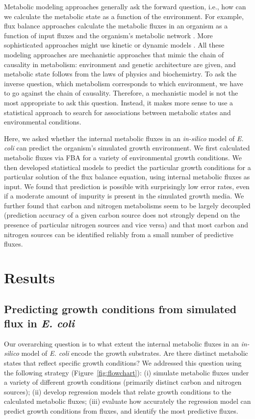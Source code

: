 \documentclass[12pt]{article}
\begin{document}
Metabolic modeling approaches generally ask the forward question, i.e., how can we calculate the metabolic state as a function of the environment. For example, flux balance approaches calculate the metabolic fluxes in an organism as a function of input fluxes and the organism's metabolic network \cite{Segreetal2002,Feistetal2007,SnitkinSegre2008,Orthetal2010}. More sophisticated approaches might use kinetic or dynamic models \cite{Covertetal2008,Adadietal2012}. All these modeling approaches are mechanistic approaches that mimic the chain of causality in metabolism: environment and genetic architecture are given, and metabolic state follows from the laws of physics and biochemistry. To ask the inverse question, which metabolism corresponds to which environment, we have to go against the chain of causality. Therefore, a mechanistic model is not the most appropriate to ask this question. Instead, it makes more sense to use a statistical approach to search for associations between metabolic states and environmental conditions.

Here, we asked whether the internal metabolic fluxes in an \emph{in-silico} model of \emph{E. coli} can predict the organism's simulated growth environment. We first calculated metabolic fluxes via FBA for a variety of environmental growth conditions. We then developed statistical models to predict the particular growth conditions for a particular solution of the flux balance equation, using internal metabolic fluxes as input. We found that prediction is possible with surprisingly low error rates, even if a moderate amount of impurity is present in the simulated growth media. We further found that carbon and nitrogen metabolisms seem to be largely decoupled (prediction accuracy of a given carbon source does not strongly depend on the presence of particular nitrogen sources and vice versa) and that most carbon and nitrogen sources can be identified reliably from a small number of predictive fluxes.

\section{Results}

\subsection{Predicting growth conditions from simulated flux in \emph{E. coli}}

Our overarching question is to what extent the internal metabolic fluxes in an \emph{in-silico} model of \emph{E. coli} encode the growth substrates. Are there distinct metabolic states that reflect specific growth conditions? We addressed this question using the following strategy (Figure~\ref{fig:flowchart}): (i) simulate metabolic fluxes under a variety of different growth conditions (primarily distinct carbon and nitrogen sources); (ii) develop regression models that relate growth conditions to the calculated metabolic fluxes; (iii) evaluate how accurately the regression model can predict growth conditions from fluxes, and identify the most predictive fluxes.
\end{document}
